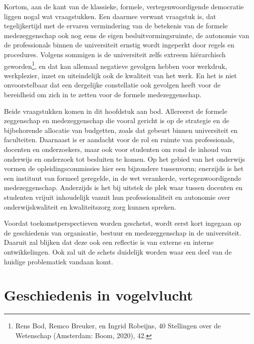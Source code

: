 \documentclass{jote-book}
\begin{document}
	Kortom, aan de kant van de klassieke, formele, vertegenwoordigende democratie liggen nogal wat vraagstukken. Een daarmee verwant vraagstuk is, dat tegelijkertijd met de ervaren vermindering van de betekenis van de formele medezeggenschap ook nog eens de eigen besluitvormingsruimte, de autonomie van de professionals binnen de universiteit ernstig wordt ingeperkt door regels en procedures. Volgens sommigen is de universiteit zelfs extreem hiërarchisch geworden\footnote{Rens Bod, Remco Breuker, en Ingrid Robeijns, 40 Stellingen over de Wetenschap (Amsterdam: Boom, 2020), 42.}, en dat kan allemaal negatieve gevolgen hebben voor werkdruk, werkplezier, inzet en uiteindelijk ook de kwaliteit van het werk. En het is niet onvoorstelbaar dat een dergelijke constellatie ook gevolgen heeft voor de bereidheid om zich in te zetten voor de formele medezeggenschap.



	Beide vraagstukken komen in dit hoofdstuk aan bod. Allereerst de formele zeggenschap en medezeggenschap die vooral gericht is op de strategie en de bijbehorende allocatie van budgetten, zoals dat gebeurt binnen universiteit en faculteiten. Daarnaast is er aandacht voor de rol en ruimte van professionals, docenten en onderzoekers, maar ook voor studenten om rond de inhoud van onderwijs en onderzoek tot besluiten te komen. Op het gebied van het onderwijs vormen de opleidingscommissies hier een bijzondere tussenvorm; enerzijds is het een instituut van formeel geregelde, in de wet verankerde, vertegenwoordigende medezeggenschap. Anderzijds is het bij uitstek de plek waar tussen docenten en studenten vrijuit inhoudelijk vanuit hun professionaliteit en autonomie over onderwijskwaliteit en kwaliteitszorg zorg kunnen spreken.



	Voordat toekomstperspectieven worden geschetst, wordt eerst kort ingegaan op de geschiedenis van organisatie, bestuur en medezeggenschap in de universiteit. Daaruit zal blijken dat deze ook een reflectie is van externe en interne ontwikkelingen. Ook zal uit de schets duidelijk worden waar een deel van de huidige problematiek vandaan komt.



	\section{Geschiedenis in vogelvlucht}
\end{document}
